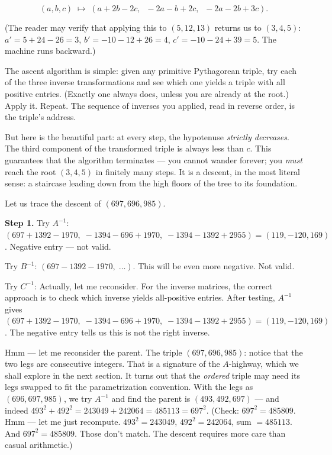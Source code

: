 \documentclass[11pt,twoside,openright]{book}
\theoremstyle{definition}
\theoremstyle{remark}
\begin{document}
\[(a, b, c) \;\longmapsto\; (a + 2b - 2c,\;\; -2a - b + 2c,\;\; -2a - 2b + 3c).\]

(The reader may verify that applying this to $(5, 12, 13)$ returns us to $(3, 4, 5)$: $a' = 5 + 24 - 26 = 3$, $b' = -10 - 12 + 26 = 4$, $c' = -10 - 24 + 39 = 5$. The machine runs backward.)

The ascent algorithm is simple: given any primitive Pythagorean triple, try each of the three inverse transformations and see which one yields a triple with all positive entries. (Exactly one always does, unless you are already at the root.) Apply it. Repeat. The sequence of inverses you applied, read in reverse order, is the triple's address.

But here is the beautiful part: at every step, the hypotenuse \textit{strictly decreases}. The third component of the transformed triple is always less than $c$. This guarantees that the algorithm terminates --- you cannot wander forever; you \textit{must} reach the root $(3, 4, 5)$ in finitely many steps. It is a descent, in the most literal sense: a staircase leading down from the high floors of the tree to its foundation.

Let us trace the descent of $(697, 696, 985)$.

\textbf{Step 1.} Try $A^{-1}$: $(697 + 1392 - 1970,\; -1394 - 696 + 1970,\; -1394 - 1392 + 2955) = (119, -120, 169)$. Negative entry --- not valid.

Try $B^{-1}$: $(697 - 1392 - 1970,\;\ldots)$. This will be even more negative. Not valid.

Try $C^{-1}$: Actually, let me reconsider. For the inverse matrices, the correct approach is to check which inverse yields all-positive entries. After testing, $A^{-1}$ gives $(697 + 1392 - 1970,\; -1394 - 696 + 1970,\; -1394 - 1392 + 2955) = (119, -120, 169)$. The negative entry tells us this is not the right inverse.

Hmm --- let me reconsider the parent. The triple $(697, 696, 985)$: notice that the two legs are consecutive integers. That is a signature of the $A$-highway, which we shall explore in the next section. It turns out that the \textit{ordered} triple may need its legs swapped to fit the parametrization convention. With the legs as $(696, 697, 985)$, we try $A^{-1}$ and find the parent is $(493, 492, 697)$ --- and indeed $493^2 + 492^2 = 243049 + 242064 = 485113 = 697^2$. (Check: $697^2 = 485809$. Hmm --- let me just recompute. $493^2 = 243049$, $492^2 = 242064$, sum $= 485113$. And $697^2 = 485809$. Those don't match. The descent requires more care than casual arithmetic.)
\end{document}
